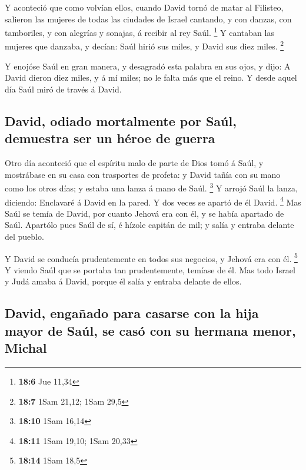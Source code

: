  Y aconteció que como volvían ellos, cuando David tornó de
matar al Filisteo, salieron las mujeres de todas las ciudades de Israel
cantando, y con danzas, con tamboriles, y con alegrías y sonajas, á
recibir al rey Saúl. \footnote{\textbf{18:6} Jue 11,34}  Y
cantaban las mujeres que danzaba, y decían: Saúl hirió sus miles, y
David sus diez miles. \footnote{\textbf{18:7} 1Sam 21,12; 1Sam 29,5}

 Y enojóse Saúl en gran manera, y desagradó esta palabra en
sus ojos, y dijo: A David dieron diez miles, y á mí miles; no le falta
más que el reino.  Y desde aquel día Saúl miró de través á
David.

\hypertarget{david-odiado-mortalmente-por-sauxfal-demuestra-ser-un-huxe9roe-de-guerra}{%
\subsection{David, odiado mortalmente por Saúl, demuestra ser un héroe
de
guerra}\label{david-odiado-mortalmente-por-sauxfal-demuestra-ser-un-huxe9roe-de-guerra}}

 Otro día aconteció que el espíritu malo de parte de Dios
tomó á Saúl, y mostrábase en su casa con trasportes de profeta: y David
tañía con su mano como los otros días; y estaba una lanza á mano de
Saúl. \footnote{\textbf{18:10} 1Sam 16,14}  Y arrojó Saúl
la lanza, diciendo: Enclavaré á David en la pared. Y dos veces se apartó
de él David. \footnote{\textbf{18:11} 1Sam 19,10; 1Sam 20,33}
 Mas Saúl se temía de David, por cuanto Jehová era con él,
y se había apartado de Saúl.  Apartólo pues Saúl de sí, é
hízole capitán de mil; y salía y entraba delante del pueblo.

 Y David se conducía prudentemente en todos sus negocios, y
Jehová era con él. \footnote{\textbf{18:14} 1Sam 18,5}  Y
viendo Saúl que se portaba tan prudentemente, temíase de él.
 Mas todo Israel y Judá amaba á David, porque él salía y
entraba delante de ellos.

\hypertarget{david-engauxf1ado-para-casarse-con-la-hija-mayor-de-sauxfal-se-casuxf3-con-su-hermana-menor-michal}{%
\subsection{David, engañado para casarse con la hija mayor de Saúl, se
casó con su hermana menor,
Michal}\label{david-engauxf1ado-para-casarse-con-la-hija-mayor-de-sauxfal-se-casuxf3-con-su-hermana-menor-michal}}


